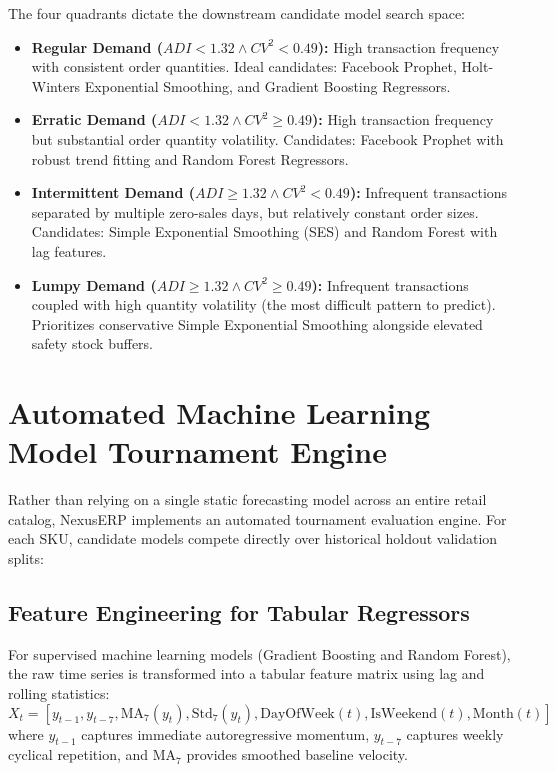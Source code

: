 The four quadrants dictate the downstream candidate model search space:
\begin{itemize}
    \item \textbf{Regular Demand ($ADI < 1.32 \land CV^2 < 0.49$):} High transaction frequency with consistent order quantities. Ideal candidates: Facebook Prophet, Holt-Winters Exponential Smoothing, and Gradient Boosting Regressors.
    \item \textbf{Erratic Demand ($ADI < 1.32 \land CV^2 \ge 0.49$):} High transaction frequency but substantial order quantity volatility. Candidates: Facebook Prophet with robust trend fitting and Random Forest Regressors.
    \item \textbf{Intermittent Demand ($ADI \ge 1.32 \land CV^2 < 0.49$):} Infrequent transactions separated by multiple zero-sales days, but relatively constant order sizes. Candidates: Simple Exponential Smoothing (SES) and Random Forest with lag features.
    \item \textbf{Lumpy Demand ($ADI \ge 1.32 \land CV^2 \ge 0.49$):} Infrequent transactions coupled with high quantity volatility (the most difficult pattern to predict). Prioritizes conservative Simple Exponential Smoothing alongside elevated safety stock buffers.
\end{itemize}

\section{Automated Machine Learning Model Tournament Engine}
Rather than relying on a single static forecasting model across an entire retail catalog, NexusERP implements an automated tournament evaluation engine. For each SKU, candidate models compete directly over historical holdout validation splits:

\subsection{Feature Engineering for Tabular Regressors}
For supervised machine learning models (Gradient Boosting and Random Forest), the raw time series is transformed into a tabular feature matrix using lag and rolling statistics:
\begin{equation}
X_t = \left[ y_{t-1}, y_{t-7}, \text{MA}_7(y_t), \text{Std}_7(y_t), \text{DayOfWeek}(t), \text{IsWeekend}(t), \text{Month}(t) \right]
\end{equation}
where $y_{t-1}$ captures immediate autoregressive momentum, $y_{t-7}$ captures weekly cyclical repetition, and $\text{MA}_7$ provides smoothed baseline velocity.

